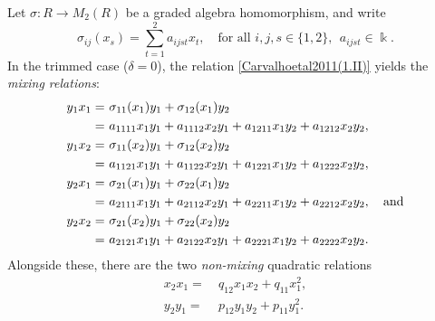 \documentclass{amsart}
\theoremstyle{definition}
\theoremstyle{remark}
\numberwithin{equation}{section}
\begin{document}
Let $\sigma:R\to M_2(R)$ be a graded algebra homomorphism, and write
\begin{equation}\label{ZhangZhang2009(E3.0.1)}
\sigma_{ij}(x_s)=\sum_{t=1}^2 a_{ijst}x_t,\quad \text{for all } i,j,s\in\{1,2\},\ \ a_{ijst}\in\Bbbk.
\end{equation}
In the trimmed case ($\delta=0$), the relation \eqref{Carvalhoetal2011(1.II)} yields the \emph{mixing relations}:
\begin{align}
y_1x_1 = &\ \sigma_{11}(x_1)y_1 + \sigma_{12}(x_1)y_2 \notag \\
= &\ a_{1111}x_1y_1 + a_{1112}x_2y_1 + a_{1211}x_1y_2 + a_{1212}x_2y_2, \label{ZhangZhangMR11} \\
y_1x_2 = &\ \sigma_{11}(x_2)y_1 + \sigma_{12}(x_2)y_2 \notag  \\
= &\ a_{1121}x_1y_1 + a_{1122}x_2y_1 + a_{1221}x_1y_2 + a_{1222}x_2y_2, \label{ZhangZhangMR12} \\
y_2x_1 = &\ \sigma_{21}(x_1)y_1 + \sigma_{22}(x_1)y_2 \notag  \\
= &\ a_{2111} x_1 y_1 + a_{2112}x_2y_1 + a_{2211}x_1y_2 + a_{2212}x_2y_2, \quad{\rm and} \label{ZhangZhangMR21} \\
y_2 x_2 = &\ \sigma_{21}(x_2)y_1 + \sigma_{22}(x_2)y_2 \notag \\
= &\ a_{2121}x_1y_1 + a_{2122}x_2y_1 + a_{2221}x_1y_2 + a_{2222}x_2y_2. \label{ZhangZhangMR22}
\end{align}
Alongside these, there are the two \emph{non-mixing} quadratic relations
\begin{align}
    x_2 x_1 = &\ q_{12}x_1x_2 + q_{11}x_1^2, \label{ZhangZhangNRx} \\
    y_2 y_1 = &\ p_{12}y_1y_2 + p_{11}y_1^2. \label{ZhangZhangNRy}
\end{align}
\end{document}
